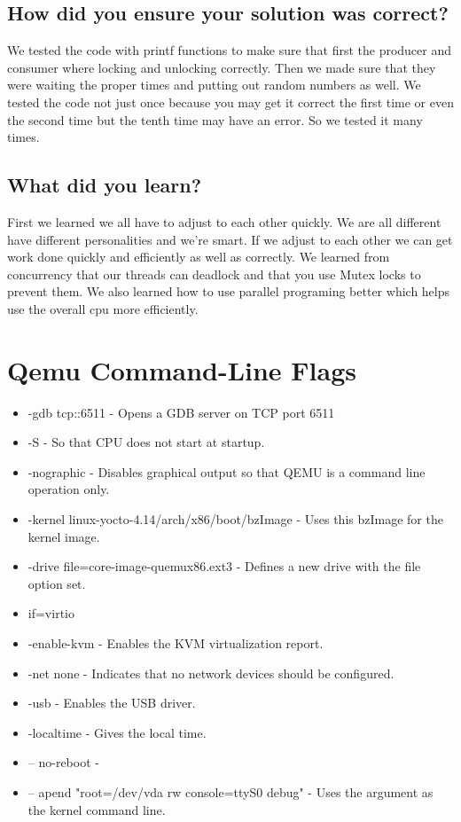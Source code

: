 \documentclass[draftclsnofoot,onecolumn,10pt,compsoc]{IEEEtran}
\begin{document}
\subsection{How did you ensure your solution was correct?}
We tested the code with printf functions to make sure that first the producer and consumer where locking and unlocking correctly.  Then we made sure that they were waiting the proper times and putting out random numbers as well.  We tested the code not just once because you may get it correct the first time or even the second time but the tenth time may have an error.  So we tested it many times.  
\subsection{What did you learn?}
First we learned we all have to adjust to each other quickly.  We are all different have different personalities and we're smart. If we adjust to each other we can get work done quickly and efficiently as well as correctly. We learned from concurrency that our threads can deadlock and that you use Mutex locks to prevent them.  We also learned how to use parallel programing better which helps use the overall cpu more efficiently.  
\section{Qemu Command-Line Flags}
\begin{itemize}
	\item -gdb tcp::6511 - Opens a GDB server on TCP port 6511
	\item -S - So that CPU does not start at startup.
	\item -nographic - Disables graphical output so that QEMU is a command line operation only.
	\item -kernel linux-yocto-4.14/arch/x86/boot/bzImage - Uses this bzImage for the kernel image.
	\item -drive file=core-image-quemux86.ext3 - Defines a new drive with the file option set.
	\item if=virtio
	\item -enable-kvm - Enables the KVM virtualization report.
	\item -net none - Indicates that no network devices should be configured.
	\item -usb - Enables the USB driver.
	\item -localtime - Gives the local time.
	\item -- no-reboot -
	\item -- apend "root=/dev/vda rw console=ttyS0 debug" - Uses the argument as the kernel command line.
\end{itemize}
\end{document}
